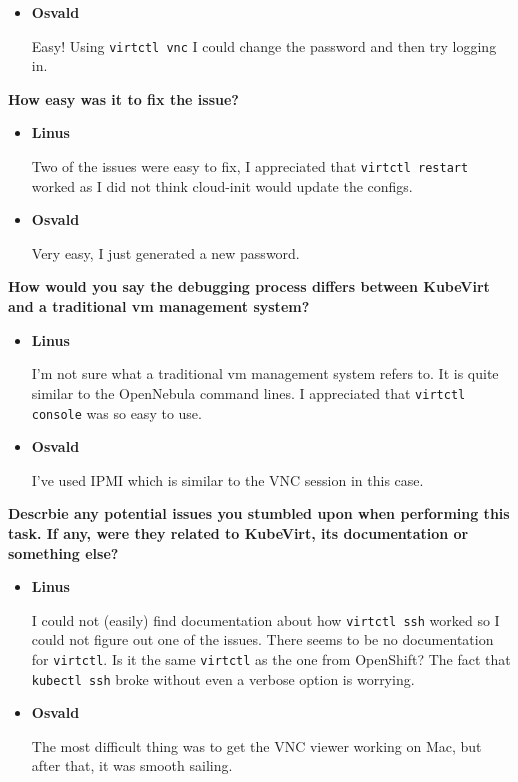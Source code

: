 \documentclass{kththesis}
\begin{document}
\begin{enumerate}
\begin{itemize}
\item \textbf{Osvald}

Easy! Using \texttt{virtctl vnc} I could change the password and then try logging in.
\end{itemize}

\noindent \textbf{How easy was it to fix the issue?}
\begin{itemize}
\item \textbf{Linus}

Two of the issues were easy to fix, I appreciated that \texttt{virtctl restart} worked as I did not think cloud-init would update the configs.

\item \textbf{Osvald}

Very easy, I just generated a new password.
\end{itemize}

\noindent \textbf{How would you say the debugging process differs between KubeVirt and a traditional \Gls{vm} management system?}
\begin{itemize}
\item \textbf{Linus}

I'm not sure what a traditional \Gls{vm} management system refers to. It is quite similar to the OpenNebula command lines. I appreciated that \texttt{virtctl console} was so easy to use.

\item \textbf{Osvald}

I've used IPMI which is similar to the VNC session in this case.
\end{itemize}

\noindent \textbf{Descrbie any potential issues you stumbled upon when performing this task. If any, were they related to KubeVirt, its documentation or something else?}
\begin{itemize}
\item \textbf{Linus}

I could not (easily) find documentation about how \texttt{virtctl ssh} worked so I could not figure out one of the issues. There seems to be no documentation for \texttt{virtctl}. Is it the same \texttt{virtctl} as the one from OpenShift? The fact that \texttt{kubectl ssh} broke without even a verbose option is worrying.

\item \textbf{Osvald}

The most difficult thing was to get the VNC viewer working on Mac, but after that, it was smooth sailing.
\end{itemize}


\end{enumerate}
\end{document}
